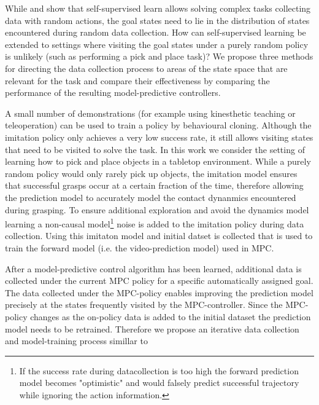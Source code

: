 While \cite{crashing} and \cite{foresight, sna} show that self-supervised learn allows solving complex tasks collecting data with random actions, the goal states need to lie in the distribution of states encountered during random data collection. How can self-supervised learning be extended to settings where visiting the goal states under a purely random policy is unlikely (such as performing a pick and place task)? We propose three methods for directing the data collection process to areas of the state space that are relevant for the task and compare their effectiveness by comparing the performance of the resulting model-predictive controllers. 

A small number of demonstrations (for example using kinesthetic teaching or teleoperation) can be used to train a policy by behavioural cloning. Although the imitation policy only achieves a very low success rate, it still allows visiting states that need to be visited to solve the task. In this work we consider the setting of learning how to pick and place objects in a tabletop environment. While a purely random policy would only rarely pick up objects, the imitation model ensures that successful grasps occur at a certain fraction of the time, therefore allowing the prediction model to accurately model the contact dynanmics encountered during grasping. To ensure additional exploration and avoid the dynamics model learning a non-causal model\footnote{If the success rate during datacollection is too high the forward prediction model becomes "optimistic" and would falsely predict successful trajectory while ignoring the action information.} noise is added to the imitation policy during data collection. Using this imitaton model and initial datset is collected that is used to train the forward model (i.e. the video-prediction model) used in MPC.

After a model-predictive control algorithm has been learned, additional data is collected under the current MPC policy for a specific automatically assigned goal. The data collected under the MPC-policy enables improving the prediction model precisely at the states frequently visited by the MPC-controller. Since the MPC-policy changes as the on-policy data is added to the initial dataset the prediction model needs to be retrained. Therefore we propose an iterative data collection and model-training process simillar to  \cite{anusha}

